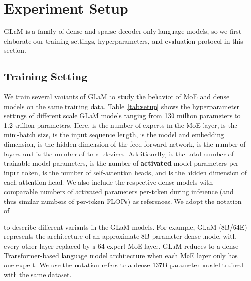\documentclass{article}
\newcommand{\glam}{GLaM\xspace}
\begin{document}
\section{Experiment Setup}
\label{sec:exp}
\glam is a family of dense and sparse decoder-only language models, so we first elaborate our training settings, hyperparameters, and evaluation protocol in this section.
\subsection{Training Setting}
\label{sec:exp_setup}

We train several variants of GLaM to study the behavior of MoE and dense models on the same training data. Table~\ref{tab:setup} shows the hyperparameter settings of different scale \glam models ranging from 130 million parameters to 1.2 trillion parameters. 
Here,  is the number of experts in the MoE layer,  is the mini-batch size,  is the input sequence length,  is the model and embedding dimension,  is the hidden dimension of the feed-forward network,  is the number of layers and  is the number of total devices. Additionally,   is the total number of trainable model parameters,  is the number of \textbf{activated} model parameters per input token,  is the number of self-attention heads, and  is the hidden dimension of each attention head.
We also include the respective dense models with comparable numbers of activated parameters per-token during inference (and thus similar numbers of per-token FLOPs) as references. We adopt the notation of 

to describe different variants in the GLaM models. For example, GLaM (8B/64E) represents the architecture of an approximate 8B parameter dense model with every other layer replaced by a 64 expert MoE layer. GLaM reduces to a dense Transformer-based language model architecture when each MoE layer only has one expert. We use the notation  
refers to a dense 137B parameter model trained with the same dataset.
\end{document}
